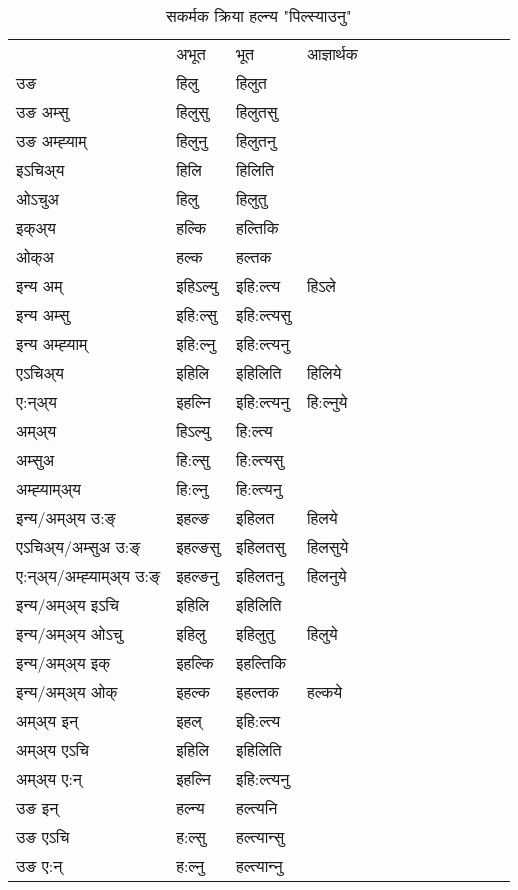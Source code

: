 \begin{table}[H]
\label{il.vt} \centering
\caption{सकर्मक क्रिया  हल्न्य  "पिल्स्याउनु"  }
\begin{tabular}{l|l|l|l|l|l|l|l|l|l|l|l|l}  \toprule
&अभूत & भूत & आज्ञार्थक \\ 
उङ &हिलु &हिलुत \\ 
उङ अम्सु &हिलुसु &हिलुतसु \\ 
उङ अम्ह्‍याम् &हिलुनु &हिलुतनु \\ 
इऽचिअ्य &हिलि &हिलिति   \\ 
ओऽचुअ &हिलु &हिलुतु   \\ 
इक्अ्य &हल्कि &हल्तिकि   \\ 
ओक्अ &हल्क &हल्तक   \\ 
इन्य अम् & इहिऽल्यु  & इहि:ल्त्य &हिऽले  \\ 
इन्य अम्सु & इहि:ल्सु  & इहि:ल्त्यसु   \\ 
इन्य अम्ह्‍याम् & इहि:ल्नु  & इहि:ल्त्यनु   \\ 
एऽचिअ्य & इहिलि & इहिलिति &हिलिये    \\ 
ए:न्अ्य & इहल्नि  & इहि:ल्त्यनु &हि:ल्नुये  \\ 
अम्अ्य & हिऽल्यु  & हि:ल्त्य  \\ 
अम्सुअ & हि:ल्सु & हि:ल्त्यसु  \\ 
अम्ह्‍याम्अ्य & हि:ल्नु  & हि:ल्त्यनु \\ 
\midrule
इन्य/अम्अ्य उ:ङ्‌&इहल्ङ & इहिलत &हिलये \\ 
एऽचिअ्य/अम्सुअ उ:ङ्‌ &इहल्ङसु & इहिलतसु &हिलसुये \\ 
ए:न्अ्य/अम्ह्‍याम्अ्य उ:ङ्‌ &इहल्ङनु & इहिलतनु &हिलनुये \\ 
इन्य/अम्अ्य इऽचि & इहिलि & इहिलिति    \\ 
इन्य/अम्अ्य ओऽचु & इहिलु & इहिलुतु  &हिलुये  \\ 
इन्य/अम्अ्य इक् & इहल्कि & इहल्तिकि   \\ 
इन्य/अम्अ्य ओक् & इहल्क & इहल्तक  &हल्कये  \\ 
अम्अ्य इन् & इहल् & इहि:ल्त्य   \\ 
अम्अ्य एऽचि & इहिलि & इहिलिति    \\ 
अम्अ्य ए:न् & इहल्नि  & इहि:ल्त्यनु  \\ 
\midrule
उङ इन् & हल्न्य  & हल्त्यनि  \\ 
उङ एऽचि & ह:ल्सु  & हल्त्यान्सु   \\ 
उङ ए:न्& ह:ल्नु  & हल्त्यान्‍नु   \\ 
\bottomrule
\end{tabular}
\end{table}


